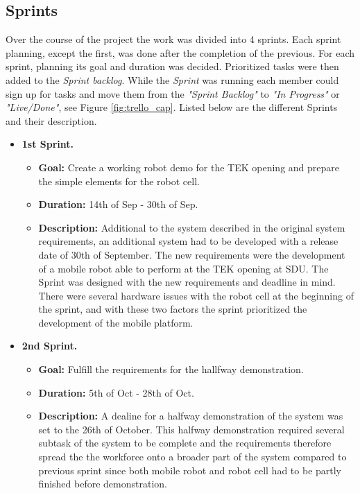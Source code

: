 \subsection{Sprints} \label{sec:sprints}
Over the course of the project the work was divided into 4 sprints. Each sprint planning, except the first, was done after the completion of the previous. For each sprint, planning its goal and duration was decided. Prioritized tasks were then added to the \emph{Sprint backlog}. While the \emph{Sprint} was running each member could sign up for tasks and move them from the \emph{"Sprint Backlog"} to \emph{"In Progress"} or \emph{"Live/Done"}, see Figure \ref{fig:trello_cap}. 
Listed below are the different Sprints and their description.

\begin{itemize}
    \item \textbf{1st Sprint.}
    \begin{itemize}
    	\item \textbf{Goal:} Create a working robot demo for the TEK opening and prepare the simple elements for the robot cell.
    	\item \textbf{Duration:} 14th of Sep - 30th of Sep.
    	\item \textbf{Description:} Additional to the system described in the original system requirements, an additional system had to be developed with a release date of 30th of September. The new requirements were the development of a mobile robot able to perform at the TEK opening at SDU. The Sprint was designed with the new requirements and deadline in mind. There were several hardware issues with the robot cell at the beginning of the sprint, and with these two factors the sprint prioritized the development of the mobile platform.
	\end{itemize}
	
    \item \textbf{2nd Sprint.}
    \begin{itemize}
    	\item \textbf{Goal:} Fulfill the requirements for the hallfway demonstration.
    	\item \textbf{Duration:} 5th of Oct - 28th of Oct.
    	\item \textbf{Description:} A dealine for a halfway demonstration of the system was set to the 26th of October. This halfway demonstration required several subtask of the system to be complete and the requirements therefore spread the the workforce onto a broader part of the system compared to previous sprint since both mobile robot and robot cell had to be partly finished before demonstration.
	\end{itemize}
	

\end{itemize}
